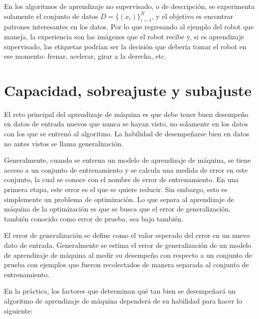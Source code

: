 \vspace{1em}

En los algoritmos de aprendizaje no supervisado, o de descripción, se experimenta solamente el conjunto de datos $D = \{(x_i)\}_{i=1}^N$, y el objetivo es encontrar patrones interesantes en los datos. Por lo que regresando al ejemplo del robot que maneja, la experiencia son las imágenes que el robot recibe y, si es aprendizaje supervisado, las etiquetas podrían ser la decisión que debería tomar el robot en ese momento: frenar, acelerar, girar a la derecha, etc. \cite{Murphy:2012:MLP:2380985}

\section{Capacidad, sobreajuste y subajuste}
El reto principal del aprendizaje de máquina es que debe tener buen desempeño en datos de entrada nuevos que nunca se hayan visto, no solamente en los datos con los que se entrenó al algoritmo. La habilidad de desempeñarse bien en datos no antes vistos se llama generalización.


\vspace{1em}

Generalmente, cuando se entrena un modelo de aprendizaje de máquina, se tiene acceso a un conjunto de entrenamiento y se calcula una medida de error en este conjunto, la cual se conoce con el nombre de error de entrenamiento. En una primera etapa, este error es el que se quiere reducir. Sin embargo, esto es simplemente un problema de optimización. Lo que separa al aprendizaje de máquina de la optimización es que se busca que el error de generalización, también conocido como error de prueba, sea bajo también. \cite{goodfellow-et-al-2016}

\vspace{1em}

El error de generalización se define como el valor esperado del error en un nuevo dato de entrada. Generalmente se estima el error de generalización de un modelo de aprendizaje de máquina al medir su desempeño con respecto a un conjunto de prueba con ejemplos que fueron recolectados de manera separada al conjunto de entrenamiento. 

\vspace{1em}

En la práctica, los factores que determinan qué tan bien se desempeñará un algoritmo de aprendizaje de máquina dependerá de su habilidad para hacer lo siguiente:

